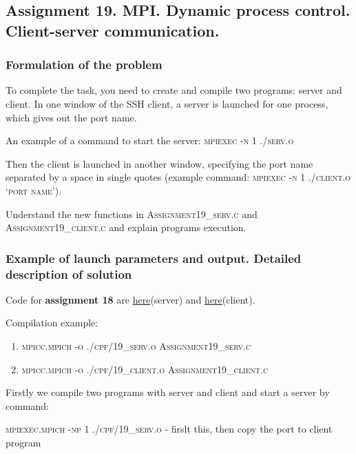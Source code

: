 \documentclass[%
12pt, %
final, %
oneside, %
onecolumn, %
centertags]{article} %
\theoremstyle{plain}
\theoremstyle{definition}
\theoremstyle{remark}
\begin{document}
\newpage

\subsection{Assignment 19. MPI. Dynamic process control. Client-server communication.}

\subsubsection{Formulation of the problem}

To complete the task, you need to create and compile two programs: server and client. In one window of the 
SSH client, a server is launched for one process, which gives out the port name.

An example of a command to start the server: \textsc{mpiexec -n 1 ./serv.o}

Then the client is launched in another window, specifying the port name separated by a space in single quotes 
(example command: \textsc{mpiexec -n 1 ./client.o ‘port name’}).

Understand the new functions in \textsc{Assignment19\_serv.c} and \textsc{Assignment19\_client.c} and explain programs 
execution.

\subsubsection{Example of launch parameters and output. Detailed description of solution}

Code for \textbf{assignment 18} are \href{https:\//github.com/aptmess/parallel_algorithms/blob/master/HT/hw_mpi/Assignment19_serv.c}{here}(server) and \href{https:\//github.com/aptmess/parallel_algorithms/blob/master/HT/hw_mpi/Assignment19_client.c}{here}(client).

Compilation example: 

\begin{enumerate}
	\item \textsc{mpicc.mpich -o ./cpf/19\_serv.o Assignment19\_serv.c}
	\item \textsc{mpicc.mpich -o ./cpf/19\_client.o Assignment19\_client.c}
\end{enumerate}

Firstly we compile two programs with server and client and start a server by command:

\textsc{mpiexec.mpich -np 1 ./cpf/19\_serv.o} - firslt this, then copy the port to client program
\end{document}
